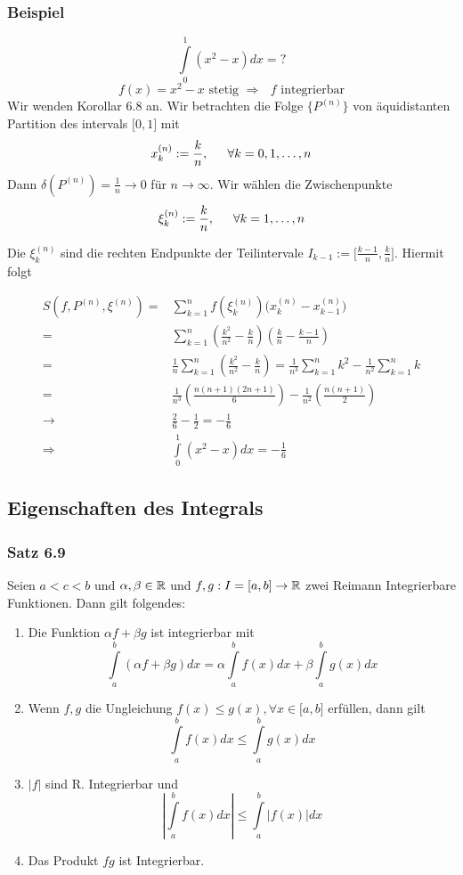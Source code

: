 \subsubsection*{Beispiel}
\[\int\limits_0^1 {({x^2} - x)dx = ?} \]
$$f(x) = {x^2} - x \text{ stetig }\Rightarrow\text{ $f$ integrierbar}$$
Wir wenden Korollar 6.8 an. Wir betrachten die Folge $\{ P^{(n)}\}$ von äquidistanten Partition des intervals $\lbrack 0,1\rbrack$ mit \[x_k^{(n)}: = \frac{k}{n},\text{\indent}\forall k = 0,1, \ldots ,n\]
Dann $\delta(P^{(n)})=\frac{1}{n}\to 0$ für $n\to\infty$. Wir wählen die Zwischenpunkte 
\[\xi _k^{(n)}: = \frac{k}{n},\text{\indent}\forall k = 1, \ldots ,n\]

Die $\xi _k^{(n)}$ sind die rechten Endpunkte der Teilintervale $I_{k-1}:=\lbrack \frac{k-1}{n},\frac{k}{n}\rbrack$. Hiermit folgt

\begin{align*}
S(f,{P^{(n)}},{\xi ^{(n)}}) =&\sum\limits_{k = 1}^n {f(\xi _k^{(n)})(x_k^{(n)} - x_{k - 1}^{(n)}} )\\
=&\sum\limits_{k = 1}^n {\left( {\frac{{{k^2}}}{{{n^2}}} - \frac{k}{n}} \right)\left( {\frac{k}{n} - \frac{{k - 1}}{n}} \right)} \\
=&\frac{1}{n}\sum\limits_{k = 1}^n {\left( {\frac{{{k^2}}}{{{n^2}}} - \frac{k}{n}} \right)} = \frac{1}{{{n^3}}}\sum\limits_{k = 1}^n {{k^2}}  - \frac{1}{{{n^2}}}\sum\limits_{k = 1}^n k \\
=&\frac{1}{{{n^3}}}\left( {\frac{{n(n + 1)(2n + 1)}}{6}} \right) - \frac{1}{{{n^2}}}\left( {\frac{{n(n + 1)}}{2}} \right)\\
\to&\frac{2}{6} - \frac{1}{2} =  - \frac{1}{6}\\
\Rightarrow&\int\limits_0^1 {({x^2} - x)dx =  - \frac{1}{6}}
\end{align*}

\subsection*{Eigenschaften des Integrals}
\subsubsection*{Satz 6.9}
Seien $a<c<b$ und $\alpha, \beta \in \mathbb{R}$ und $f,g:I=\lbrack a,b \rbrack\to\mathbb{R}$ zwei Reimann Integrierbare Funktionen. Dann gilt folgendes:
\begin{enumerate}
\item Die Funktion $\alpha f + \beta g$ ist integrierbar mit \[\int\limits_a^b {(\alpha f + \beta g)dx = \alpha \int\limits_a^b {f(x)dx + \beta \int\limits_a^b {g(x)dx} } } \]
\item Wenn $f,g$ die Ungleichung $f(x)\leq g(x), \forall x\in\lbrack a,b\rbrack$ erfüllen, dann gilt \[\int\limits_a^b {f(x)dx \le \int\limits_a^b {g(x)dx} } \]
\item $\left| f \right|$ sind R. Integrierbar und \[\left| {\int\limits_a^b {f(x)dx} } \right| \le \int\limits_a^b {\left| {f(x)} \right|dx} \]
\item Das Produkt $fg$ ist Integrierbar.
\end{enumerate}


